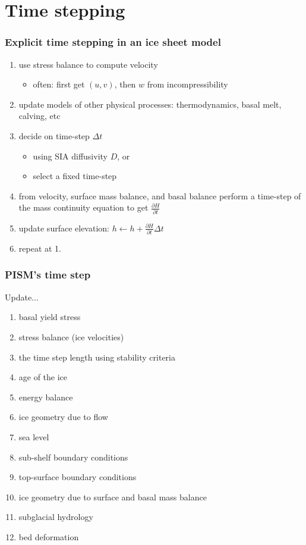 \documentclass[hide notes,intlimits]{beamer}
\newcommand{\diff}[2]{\frac{\partial #1}{\partial #2}}
\begin{document}
\section{Time stepping}
\label{sec:time-stepping}

\begin{frame}
  \frametitle{Explicit time stepping in an ice sheet model}

  \begin{enumerate}
  \item use stress balance to compute velocity
    \begin{itemize}
    \item often: first get $(u,v)$, then $w$ from incompressibility
    \end{itemize}
  \item update models of other physical processes: thermodynamics, basal melt, calving, etc
  \item decide on time-step $\Delta t$
    \begin{itemize}
    \item using SIA diffusivity $D$, or
    \item select a fixed time-step
    \end{itemize}
  \item from velocity, surface mass balance, and basal balance perform
    a time-step of the mass continuity equation to get $\diff{H}{t}$
  \item update surface elevation: $h \gets h + \diff{H}{t} \Delta t$
  \item repeat at 1.
  \end{enumerate}
\end{frame}

\begin{frame}
  \frametitle{PISM's time step}
  Update...
  \begin{enumerate}
  \item basal yield stress
  \item stress balance (ice velocities)
  \item the time step length using stability criteria
  \item age of the ice
  \item energy balance
  \item ice geometry due to flow
  \item sea level
  \item sub-shelf boundary conditions
  \item top-surface boundary conditions
  \item ice geometry due to surface and basal mass balance
  \item subglacial hydrology
  \item bed deformation
  \end{enumerate}
\end{frame}
\end{document}
